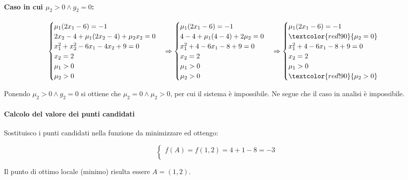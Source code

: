 \documentclass[\main/main.tex]{subfiles}
\begin{document}
\paragraph*{Caso in cui $\mu_2 > 0 \land g_2 = 0$:}
\[
	\begin{cases}
		\mu_1(2x_1 - 6)  = -1                     \\
		2x_2 -4 + \mu_1(2x_2 - 4) + \mu_2 x_2 = 0 \\
		x^2_1+x^2_2-6x_1-4x_2+9 = 0               \\
		x_2 = 2                                   \\
		\mu_1 > 0                                 \\
		\mu_2 > 0
	\end{cases}
	\Rightarrow
	\begin{cases}
		\mu_1(2x_1 - 6)  = -1            \\
		4 -4 + \mu_1(4 - 4) + 2\mu_2 = 0 \\
		x^2_1+4-6x_1-8+9 = 0             \\
		x_2 = 2                          \\
		\mu_1 > 0                        \\
		\mu_2 > 0
	\end{cases}
	\Rightarrow
	\begin{cases}
		\mu_1(2x_1 - 6)  = -1        \\
		\textcolor{red!90}{\mu_2 =0} \\
		x^2_1+4-6x_1-8+9 = 0         \\
		x_2 = 2                      \\
		\mu_1 > 0                    \\
		\textcolor{red!90}{\mu_2 > 0}
	\end{cases}
\]

Ponendo $\mu_2 > 0 \land g_2 = 0$ si ottiene che $\mu_2 = 0 \land \mu_2 > 0$, per cui il sistema è impossibile. Ne segue che il caso in analisi è impossibile.

\paragraph*{Calcolo del valore dei punti candidati}
Sostituisco i punti candidati nella funzione da minimizzare ed ottengo:

\[
	\begin{cases}
		f(A) = f(1,2) =  4 + 1 - 8 = -3 \\
	\end{cases}
\]

Il punto di ottimo locale (minimo) risulta essere $A = (1, 2)$.
\end{document}
